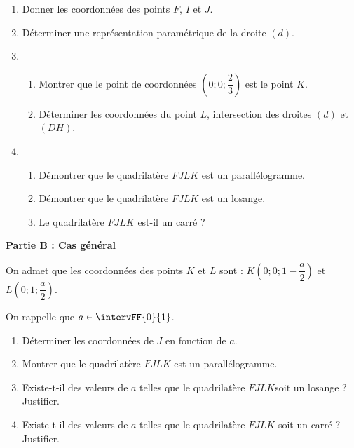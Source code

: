 \begin{enumerate}
	\item Donner les coordonnées des points $F$, $I$ et $J$.
	\item Déterminer une représentation paramétrique de la droite $(d)$.
	\item 
	\begin{enumerate}
		\item Montrer que le point de coordonnées $\left(0;0;\dfrac23\right)$ est le point $K$.
		\item Déterminer les coordonnées du point $L$, intersection des droites $(d)$ et $(DH)$.
	\end{enumerate}
	\item 
	\begin{enumerate}
		\item Démontrer que le quadrilatère $FJLK$ est un parallélogramme.
		\item Démontrer que le quadrilatère $FJLK$ est un losange.
		\item Le quadrilatère $FJLK$ est-il un carré ?
	\end{enumerate}
\end{enumerate}

\smallskip

\textbf{Partie B : Cas général}

\medskip

On admet que les coordonnées des points $K$ et $L$ sont : $K\left(0;0;1-\dfrac{a}{2}\right)$ et $L\left(0;1;\dfrac{a}{2}\right)$.

On rappelle que $a \in \intervFF{0}{1}$.

\begin{enumerate}
	\item Déterminer les coordonnées de $J$ en fonction de $a$.
	\item Montrer que le quadrilatère $FJLK$ est un parallélogramme.
	\item Existe-t-il des valeurs de $a$ telles que le quadrilatère $FJLK $soit un losange ? Justifier.
	\item Existe-t-il des valeurs de $a$ telles que le quadrilatère $FJLK$ soit un carré ? Justifier.
\end{enumerate}

